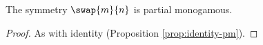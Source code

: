 \documentclass[10pt]{article}
\begin{document}
\begin{proposition}
    The symmetry $\swap{m}{n}$ is partial monogamous.
\end{proposition}
\begin{proof}
    As with identity (Proposition \ref{prop:identity-pm}).
\end{proof}






\end{document}
